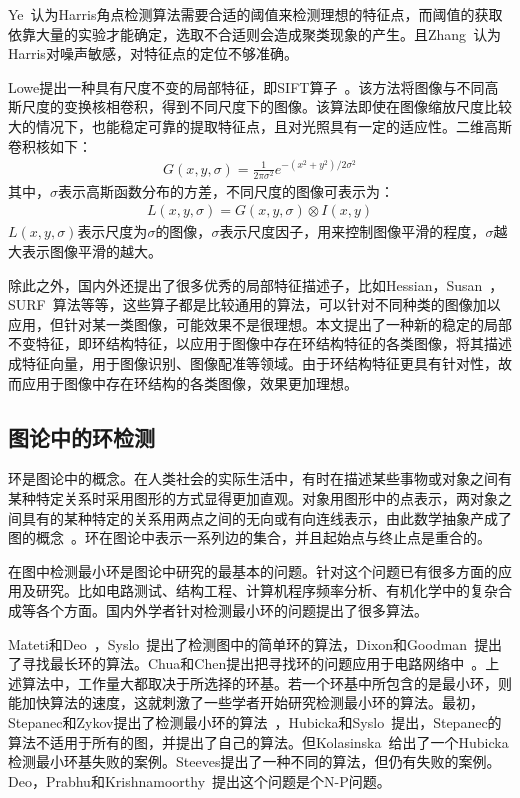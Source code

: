 Ye~\cite{yezhiyong}认为Harris角点检测算法需要合适的阈值来检测理想的特征点，而阈值的获取依靠大量的实验才能确定，选取不合适则会造成聚类现象的产生。且Zhang~\cite{zhangyong}认为Harris对噪声敏感，对特征点的定位不够准确。

Lowe提出一种具有尺度不变的局部特征，即SIFT算子~\cite{lowe}。该方法将图像与不同高斯尺度的变换核相卷积，得到不同尺度下的图像。该算法即使在图像缩放尺度比较大的情况下，也能稳定可靠的提取特征点，且对光照具有一定的适应性。二维高斯卷积核如下：
\begin{align}
G(x, y, \sigma) = \frac{1}{2\pi\sigma^2}e^{-(x^2+y^2)/2\sigma^2}
\end{align}
其中，$\sigma$表示高斯函数分布的方差，不同尺度的图像可表示为：
\begin{align}
L(x, y, \sigma) = G(x, y, \sigma) \otimes I(x, y)
\end{align}
$L(x, y, \sigma)$表示尺度为$\sigma$的图像，$\sigma$表示尺度因子，用来控制图像平滑的程度，$\sigma$越大表示图像平滑的越大。

除此之外，国内外还提出了很多优秀的局部特征描述子，比如Hessian，Susan~\cite{smith}，SURF~\cite{bay}算法等等，这些算子都是比较通用的算法，可以针对不同种类的图像加以应用，但针对某一类图像，可能效果不是很理想。本文提出了一种新的稳定的局部不变特征，即环结构特征，以应用于图像中存在环结构特征的各类图像，将其描述成特征向量，用于图像识别、图像配准等领域。由于环结构特征更具有针对性，故而应用于图像中存在环结构的各类图像，效果更加理想。

\subsection{图论中的环检测}
\label{sec:complicatedtable}

环是图论中的概念。在人类社会的实际生活中，有时在描述某些事物或对象之间有某种特定关系时采用图形的方式显得更加直观。对象用图形中的点表示，两对象之间具有的某种特定的关系用两点之间的无向或有向连线表示，由此数学抽象产成了图的概念~\cite{xujunming}。环在图论中表示一系列边的集合，并且起始点与终止点是重合的。

在图中检测最小环是图论中研究的最基本的问题。针对这个问题已有很多方面的应用及研究。比如电路测试、结构工程、计算机程序频率分析、有机化学中的复杂合成等各个方面。国内外学者针对检测最小环的问题提出了很多算法。

Mateti和Deo~\cite{mateti}，Syslo~\cite{syslo}提出了检测图中的简单环的算法，Dixon和Goodman~\cite{goodman}提出了寻找最长环的算法。Chua和Chen提出把寻找环的问题应用于电路网络中~\cite{chua}。上述算法中，工作量大都取决于所选择的环基。若一个环基中所包含的是最小环，则能加快算法的速度，这就刺激了一些学者开始研究检测最小环的算法。最初，Stepanec和Zykov提出了检测最小环的算法~\cite{stepanec}，Hubicka和Syslo~\cite{hubicka}提出，Stepanec的算法不适用于所有的图，并提出了自己的算法。但Kolasinska~\cite{kola}给出了一个Hubicka检测最小环基失败的案例。Steeves提出了一种不同的算法，但仍有失败的案例。Deo，Prabhu和Krishnamoorthy~\cite{deo}提出这个问题是个N-P问题。

